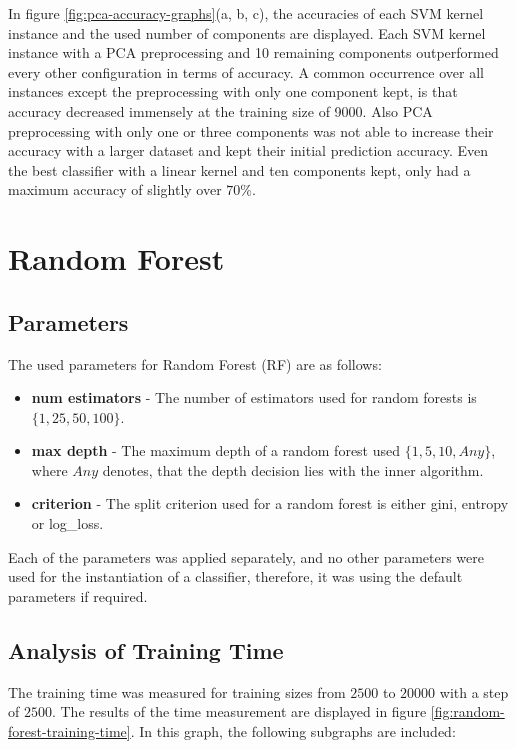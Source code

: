 \documentclass{article}[12pt]
\theoremstyle{mydef}
\begin{document}
            In figure \ref{fig:pca-accuracy-graphs}(a, b, c), the accuracies of each SVM kernel instance and the used number of components are displayed.
            Each SVM kernel instance with a PCA preprocessing and 10 remaining components outperformed every other configuration in terms of accuracy.
            A common occurrence over all instances except the preprocessing with only one component kept, is that accuracy decreased immensely at the training size of 9000.
            Also PCA preprocessing with only one or three components was not able to increase their accuracy with a larger dataset and kept their initial prediction accuracy.
            Even the best classifier with a linear kernel and ten components kept, only had a maximum accuracy of slightly over $70\%$.

    \section{Random Forest}
    \label{sec:random-forest}

        \subsection*{Parameters}
        The used parameters for Random Forest (RF) are as follows: 

        \begin{itemize}
            \item \textbf{num estimators} - The number of estimators used for random forests is $\{1, 25, 50, 100\}$.
            \item \textbf{max depth} - The maximum depth of a random forest used $\{1, 5, 10, Any\}$, where $Any$ denotes, that the depth decision lies with the inner algorithm.
            \item \textbf{criterion} - The split criterion used for a random forest is either gini, entropy or log\_loss.
        \end{itemize}
        Each of the parameters was applied separately, and no other parameters were used for the instantiation of a classifier, therefore, it was using the default parameters if required.
        
        \subsection{Analysis of Training Time}


            The training time was measured for training sizes from $2500$ to $20000$ with a step of $2500$. 
            The results of the time measurement are displayed in figure \ref{fig:random-forest-training-time}. 
            In this graph, the following subgraphs are included:
\end{document}

